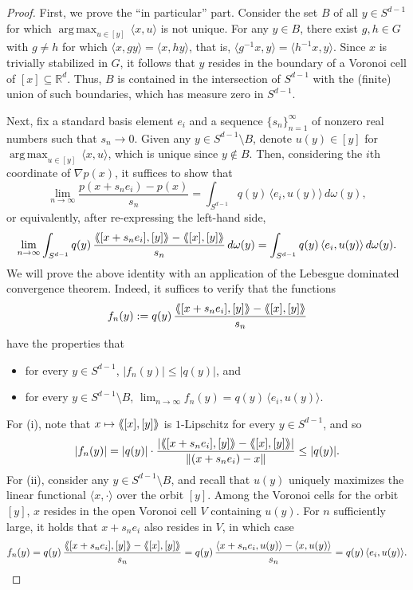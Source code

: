 \documentclass{article}
\theoremstyle{plain}
\theoremstyle{definition}
\newcommand{\llangle}{\langle\hspace{-2.5pt}\langle}
\newcommand{\rrangle}{\rangle\hspace{-2.5pt}\rangle}
\DeclareMathOperator*{\argmax}{arg\,max}
\begin{document}
\begin{proof}
First, we prove the ``in particular'' part.
Consider the set $B$ of all $y \in S^{d-1}$ for which $\argmax_{u \in [y]}\,\langle x,u\rangle$ is not unique.
For any $y \in B$, there exist $g,h \in G$ with $g \neq h$ for which $\langle x, gy \rangle = \langle x, hy \rangle$, that is, $\langle g^{-1}x, y \rangle = \langle h^{-1}x, y \rangle$.
Since $x$ is trivially stabilized in $G$, it follows that $y$ resides in the boundary of a Voronoi cell of $[x] \subseteq \mathbb{R}^d$.
Thus, $B$ is contained in the intersection of $S^{d-1}$ with the (finite) union of such boundaries, which has measure zero in $S^{d-1}$.

Next, fix a standard basis element $e_i$ and a sequence $\{s_n\}_{n=1}^\infty$ of nonzero real numbers such that $s_n\to0$.
Given any $y \in S^{d-1}\setminus B$, denote $u(y) \in [y]$ for $\argmax_{u\in [y]}\,\langle x,u\rangle$, which is unique since $y \notin B$.
Then, considering the $i$th coordinate of $\nabla p(x)$, it suffices to show that
\[
\lim_{n\to\infty}\frac{p(x+s_ne_i)-p(x)}{s_n}
=\int_{S^{d-1}}q(y)\,\langle e_i,u(y)\rangle\,d\omega(y),
\]
or equivalently, after re-expressing the left-hand side,
\[
\lim_{n\to\infty}\int_{S^{d-1}}q(y)\,\frac{\llangle [x+s_ne_i],[y]\rrangle - \llangle [x],[y]\rrangle}{s_n}\,d\omega(y)
= \int_{S^{d-1}}q(y)\,\langle e_i,u(y)\rangle\,d\omega(y).
\]
We will prove the above identity with an application of the Lebesgue dominated convergence theorem.
Indeed, it suffices to verify that the functions
\[
f_n(y)
:=q(y)\,\frac{\llangle [x+s_ne_i],[y] \rrangle - \llangle [x],[y] \rrangle}{s_n}
\]
have the properties that
\begin{itemize}
\item[(i)]
for every $y \in S^{d-1}$, $|f_n(y)| \leq |q(y)|$, and
\item[(ii)]
for every $y\in S^{d-1}\setminus B$, $\displaystyle\lim_{n\to \infty} f_n(y) = q(y)\,\langle e_i,u(y)\rangle$.
\end{itemize}
For (i), note that $x \mapsto \llangle [x],[y]\rrangle$ is $1$-Lipschitz for every $y\in S^{d-1}$, and so
\[
|f_n(y)|
= |q(y)|\cdot\frac{|\llangle [x+s_ne_i],[y] \rrangle - \llangle [x],[y] \rrangle|}{\|(x+s_n e_i) - x\|}
\leq |q(y)|.
\]
For (ii), consider any $y \in S^{d-1} \setminus B$, and recall that $u(y)$ uniquely maximizes the linear functional $\langle x,\cdot\rangle$ over the orbit $[y]$.
Among the Voronoi cells for the orbit $[y]$, $x$ resides in the open Voronoi cell $V$ containing $u(y)$.
For $n$ sufficiently large, it holds that $x+s_n e_i$ also resides in $V$, in which case
\[
f_n(y)
=q(y)\,\frac{\llangle [x+s_ne_i],[y] \rrangle - \llangle [x],[y] \rrangle}{s_n}
=q(y)\,\frac{\langle x+s_ne_i,u(y)\rangle-\langle x,u(y)\rangle}{s_n}
=q(y)\,\langle e_i,u(y)\rangle.
\qedhere
\]
\end{proof}
\end{document}
